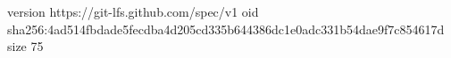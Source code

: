version https://git-lfs.github.com/spec/v1
oid sha256:4ad514fbdade5fecdba4d205cd335b644386dc1e0adc331b54dae9f7c854617d
size 75
